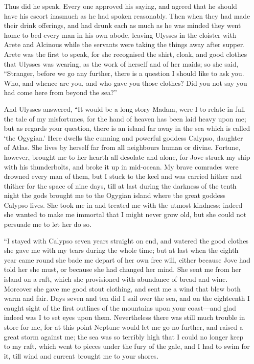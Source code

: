 Thus did he speak. Every one approved his saying, and agreed that he should
have his escort inasmuch as he had spoken reasonably. Then when they had made
their drink offerings, and had drunk each as much as he was minded they went
home to bed every man in his own abode, leaving Ulysses in the cloister with
Arete and Alcinous while the servants were taking the things away after supper.
Arete was the first to speak, for she recognised the shirt, cloak, and good
clothes that Ulysses was wearing, as the work of herself and of her maids; so
she said, “Stranger, before we go any further, there is a question I should
like to ask you. Who, and whence are you, and who gave you those clothes? Did
you not say you had come here from beyond the sea?”

And Ulysses answered, “It would be a long story Madam, were I to relate in full
the tale of my misfortunes, for the hand of heaven has been laid heavy upon me;
but as regards your question, there is an island far away in the sea which is
called ‘the Ogygian.’ Here dwells the cunning and powerful goddess Calypso,
daughter of Atlas. She lives by herself far from all neighbours human or
divine. Fortune, however, brought me to her hearth all desolate and alone, for
Jove struck my ship with his thunderbolts, and broke it up in mid-ocean. My
brave comrades were drowned every man of them, but I stuck to the keel and was
carried hither and thither for the space of nine days, till at last during the
darkness of the tenth night the gods brought me to the Ogygian island where the
great goddess Calypso lives. She took me in and treated me with the utmost
kindness; indeed she wanted to make me immortal that I might never grow old,
but she could not persuade me to let her do so.

“I stayed with Calypso seven years straight on end, and watered the good
clothes she gave me with my tears during the whole time; but at last when the
eighth year came round she bade me depart of her own free will, either because
Jove had told her she must, or because she had changed her mind. She sent me
from her island on a raft, which she provisioned with abundance of bread and
wine. Moreover she gave me good stout clothing, and sent me a wind that blew
both warm and fair. Days seven and ten did I sail over the sea, and on the
eighteenth I caught sight of the first outlines of the mountains upon your
coast—and glad indeed was I to set eyes upon them. Nevertheless there was still
much trouble in store for me, for at this point Neptune would let me go no
further, and raised a great storm against me; the sea was so terribly high that
I could no longer keep to my raft, which went to pieces under the fury of the
gale, and I had to swim for it, till wind and current brought me to your
shores.

